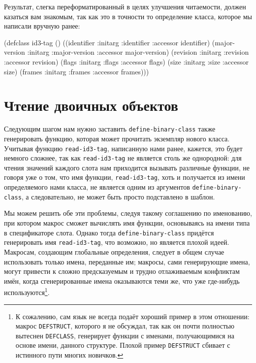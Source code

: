 Результат, слегка переформатированный в целях улучшения читаемости, должен казаться вам
знакомым, так как это в точности то определение класса, которое мы написали вручную ранее:

\begin{myverb}
(defclass id3-tag ()
  ((identifier      :initarg :identifier    :accessor identifier)
   (major-version   :initarg :major-version :accessor major-version)
   (revision        :initarg :revision      :accessor revision)
   (flags           :initarg :flags         :accessor flags)
   (size            :initarg :size          :accessor size)
   (frames          :initarg :frames        :accessor frames)))
\end{myverb}

\section{Чтение двоичных объектов}

Следующим шагом нам нужно заставить \lstinline{define-binary-class} также генерировать функцию,
которая может прочитать экземпляр нового класса. Учитывая функцию \lstinline{read-id3-tag},
написанную нами ранее, кажется, это будет немного сложнее, так как \lstinline{read-id3-tag} не
является столь же однородной: для чтения значений каждого слота нам приходится вызывать
различные функции, не говоря уже о том, что имя функции, \lstinline{read-id3-tag}, хоть и
получается из имени определяемого нами класса, не является одним из аргументов
\lstinline{define-binary-class}, а следовательно, не может быть просто подставлено в шаблон.

Мы можем решить обе эти проблемы, следуя такому соглашению по именованию, при котором
макрос сможет вычислять имя функции, основываясь на имени типа в спецификаторе
слота. Однако тогда \lstinline{define-binary-class} придётся генерировать имя
\lstinline{read-id3-tag}, что возможно, но является плохой идеей. Макросам, создающим
глобальные определения, следует в общем случае использовать только имена, переданные им;
макросы, сами генерирующие имена, могут привести к сложно предсказуемым и
трудно отлаживаемым конфликтам имён, когда сгенерированные имена оказываются теми же, что
уже где-нибудь используются\footnote{К сожалению, сам язык не всегда подаёт хороший пример
  в этом отношении: макрос \lstinline{DEFSTRUCT}, которого я не обсуждал, так как он почти
  полностью вытеснен \lstinline{DEFCLASS}, генерирует функции с именами, получающимися на
  основе имени, данного структуре. Плохой пример \lstinline{DEFSTRUCT} сбивает с истинного
  пути многих новичков.}\hspace{\footnotenegspace}.

